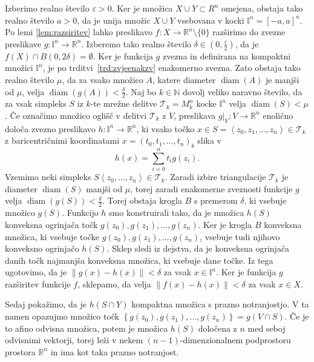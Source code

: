 \documentclass[mat1]{fmfdelo}
\newcommand{\R}{\mathbb R}
\newcommand{\N}{\mathbb N}
\DeclareMathOperator{\diam}{diam}
\newcommand{\I}{\mathbb I}
\newcommand{\0}{0}
\newcommand{\pT}{\mathcal T}
\begin{document}
\begin{dokaz}
Izberimo realno število $\varepsilon > 0$. Ker je množica $X \cup Y \subset R^n$ omejena, obstaja tako realno število $a > 0$, da je unija množic $X \cup Y$ vsebovana v kocki $\I^n = \left [ -a, a \right ]^n$. Po lemi \ref{lem:razsiritev} lahko preslikavo $f : X \to \R^n \setminus \{ \0 \}$ razširimo do zvezne preslikave $g : \I^n \to \R^n$. Izberemo tako realno število $\delta \in (0, \frac{\varepsilon}{2})$, da je $f(X) \cap B( \0, 2\delta) = \emptyset$. Ker je funkcija $g$ zvezna in definirana na kompaktni množici $\I^n$, je po trditvi~\ref{trd:zvjeenakzv} enakomerno zvezna. Zato obstaja tako realno število $\mu$, da za vsako množico $A$, katere diameter $\diam(A)$ je manjši od $\mu$, velja $\diam(g(A)) < \frac{\delta}{2}$. Naj bo $k \in \N$ dovolj veliko naravno število, da za vsak simpleks $S$ iz $k$-te mrežne delitve $\pT_k = M_k^n$ kocke $\I^n$ velja $\diam(S) < \mu$. Če označimo množico oglišč v delitvi $\pT_k$ z $V$, preslikava $g|_V : V \to \R^n$ enolično določa zvezno preslikavo $h : \I^n \to \R^n$, ki vsako točko $x \in S = \left < z_0, z_1, \dots, z_n \right > \in \pT_k$ z baricentričnimi koordinatami $x = (t_0, t_1, \dots, t_n)_b$ slika v 
$$h(x) = \sum_{i=0}^n t_i g(z_i).$$
Vzemimo neki simpleks $S \left < z_0, \dots, z_n \right > \in \pT_k$. Zaradi izbire triangulacije $\pT_k$ je diameter $\diam(S)$ manjši od $\mu$, torej zaradi enakomerne zveznosti funkcije $g$ velja $\diam (g(S)) < \frac{\delta}{2}$. Torej obstaja krogla $B$ s premerom $\delta$, ki vsebuje množico $g(S)$. Funkcijo $h$ smo konstruirali tako, da je množica $h(S)$ konveksna ogrinjača točk $g(z_0), g(z_1), \dots, g(z_n)$. Ker je krogla $B$ konveksna množica, ki vsebuje točke $g(z_0), g(z_1), \dots, g(z_n)$, vsebuje tudi njihovo konveksno ogrinjačo $h(S)$. Sklep sledi iz dejstva, da je konveksna ogrinjača danih točk najmanjša konveksna množica, ki vsebuje dane točke. Iz tega ugotovimo, da je $\| g(x) - h(x) \| < \delta$ za vsak $x \in \I^n$. Ker je funkcija $g$ razširitev funkcije $f$, sklepamo, da velja $\| f(x) - h(x) \| < \delta$ za vsak $x \in X$.

Sedaj pokažimo, da je $h(S\cap Y)$ kompaktna množica s prazno notranjostjo. V ta namen opazujmo množico točk $\left \{ g(z_0), g(z_1), \dots, g(z_n) \right \} = g(V \cap S)$. Če je to afino odvisna množica, potem je množica $h(S)$ določena z $n$ med seboj odvisnimi vektorji, torej leži v nekem $(n-1)$-dimenzionalnem podprostoru prostora $\R^n$ in ima kot taka prazno notranjost. 


\end{dokaz}
\end{document}
